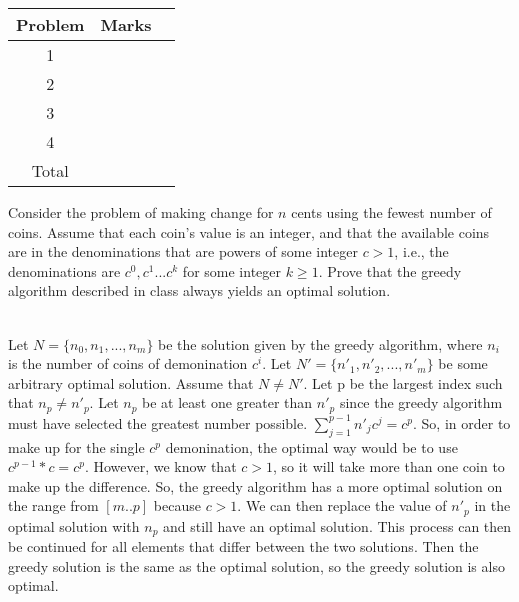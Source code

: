 \documentclass{assignment}
\begin{document}
\begin{center}
\renewcommand{\arraystretch}{2}
\begin{tabular}{|c|c|c|} \hline
Problem & Marks \\ \hline \hline
1 & \\ \hline
2 & \\ \hline
3 & \\ \hline
4 & \\ \hline \hline
Total & \\ \hline
\end{tabular}
\end{center}

\bigskip

\begin{problemlist}

\clearpage
\pbitem
\begin{problem}
Consider the problem of making change for $n$ cents using the fewest number of coins. Assume that each coin's value is an integer, and that the available coins are in the denominations that are powers of some integer $c>1$, i.e., the denominations are $c^0,c^1...c^k$ for some integer $k\ge 1$. Prove that the greedy algorithm described in class always yields an optimal solution.\\
\end{problem}
\begin{answer}
\\
Let $N = \{n_0, n_1,..., n_m\}$ be the solution given by the greedy algorithm, where $n_i$ is the number of coins of demonination $c^i$. Let $N' = \{n'_1, n'_2,...,n'_m\}$ be some arbitrary optimal solution. Assume that $N \neq N'$. Let p be the largest index such that $n_p \neq n'_p$. Let $n_p$ be at least one greater than $n'_p$ since the greedy algorithm must have selected the greatest number possible. $\sum_{j = 1} ^ {p - 1} n'_j c^j = c^p$. So, in order to make up for the single $c^p$ demonination, the optimal way would be to use $c^{p-1}*c = c^{p}$. However, we know that $c > 1$, so it will take more than one coin to make up the difference. So, the greedy algorithm has a more optimal solution on the range from $[m..p]$ because $c> 1$. We can then replace the value of $n'_p$ in the optimal solution with $n_p$ and still have an optimal solution. This process can then be continued for all elements that differ between the two solutions. Then the greedy solution is the same as the optimal solution, so the greedy solution is also optimal.\\
\end{answer}

\end{problemlist}
\end{document}
